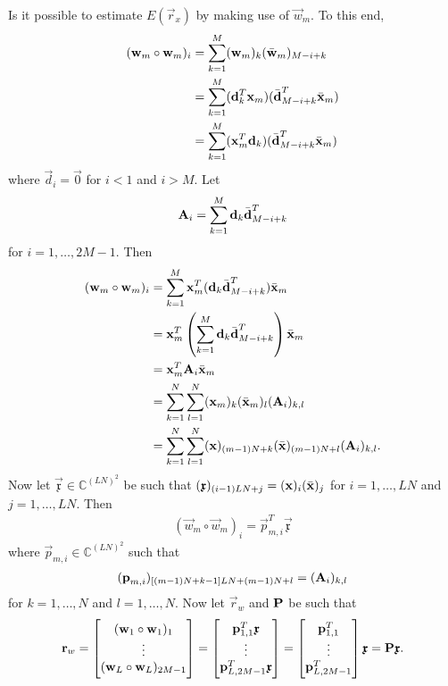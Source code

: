 \documentclass[a4paper, openany, oneside]{memoir}
\begin{document}
Is it possible to estimate $E(\vec{r}_x)$ by making use of $\vec{w}_m$. To this end,
\begin{align*}
    (\boldsymbol{\mathbf{w}}_m \circ \boldsymbol{\mathbf{w}}_m)_i &= \sum_{k=1}^M (\boldsymbol{\mathbf{w}}_m)_k (\bar{\boldsymbol{\mathbf{w}}}_m)_{M-i+k} \\
    &= \sum_{k=1}^M (\boldsymbol{\mathbf{d}}_k^T \boldsymbol{\mathbf{x}}_m)(\bar{\boldsymbol{\mathbf{d}}}_{M-i+k}^T \bar{\boldsymbol{\mathbf{x}}}_m) \\
    &= \sum_{k=1}^M (\boldsymbol{\mathbf{x}}_m^T \boldsymbol{\mathbf{d}}_k)(\bar{\boldsymbol{\mathbf{d}}}_{M-i+k}^T \bar{\boldsymbol{\mathbf{x}}}_m)
\end{align*}
where $\vec{d}_i = \vec{0}$ for $i < 1$ and $i > M$. Let
\begin{align*}
     \boldsymbol{\mathbf{A}}_i = \sum_{k=1}^M  \boldsymbol{\mathbf{d}}_k \bar{\boldsymbol{\mathbf{d}}}_{M-i+k}^T
\end{align*}
for $i = 1,\ldots,2M-1$. Then
\begin{align*}
    (\boldsymbol{\mathbf{w}}_m \circ \boldsymbol{\mathbf{w}}_m)_i &= \sum_{k=1}^M \boldsymbol{\mathbf{x}}_m^T (\boldsymbol{\mathbf{d}}_k \bar{\boldsymbol{\mathbf{d}}}_{M-i+k}^T) \bar{\boldsymbol{\mathbf{x}}}_m \\
    &= \boldsymbol{\mathbf{x}}_m^T\left(\sum_{k=1}^M  \boldsymbol{\mathbf{d}}_k \bar{\boldsymbol{\mathbf{d}}}_{M-i+k}^T\right) \bar{\boldsymbol{\mathbf{x}}}_m \\
    &= \boldsymbol{\mathbf{x}}_m^T \boldsymbol{\mathbf{A}}_i \bar{\boldsymbol{\mathbf{x}}}_m \\
    &= \sum_{k = 1}^N \sum_{l=1}^N (\boldsymbol{\mathbf{x}}_m)_k (\bar{\boldsymbol{\mathbf{x}}}_m)_l (\boldsymbol{\mathbf{A}}_i)_{k,l} \\
    &= \sum_{k = 1}^N \sum_{l=1}^N (\boldsymbol{\mathbf{x}})_{(m-1)N+k} (\bar{\boldsymbol{\mathbf{x}}})_{(m-1)N+l} (\boldsymbol{\mathbf{A}}_i)_{k,l}.
\end{align*}
Now let $\vec{\mathfrak{x}} \in \mathbb{C}^{(LN)^2}$ be such that $(\boldsymbol{\mathbf{\mathfrak{x}}})_{(i-1)LN+j} = (\boldsymbol{\mathbf{x}})_i (\bar{\boldsymbol{\mathbf{x}}})_j$ for $i = 1,\ldots,LN$ and $j = 1,\ldots,LN$. Then
\begin{align*}
    (\vec{w}_m \circ \vec{w}_m)_i = \vec{p}_{m,i}^T \vec{\mathfrak{x}}
\end{align*}
where $\vec{p}_{m,i} \in \mathbb{C}^{(LN)^2}$ such that
\begin{align*}
    (\boldsymbol{\mathbf{p}}_{m,i})_{[(m-1)N+k-1]LN+(m-1)N+l} = (\boldsymbol{\mathbf{A}}_i)_{k,l}
\end{align*}
for $k = 1,\ldots,N$ and $l = 1,\ldots,N$. Now let $\vec{r}_w$ and $\boldsymbol{\mathbf{P}}$ be such that
\begin{align*}
    \boldsymbol{\mathbf{r}}_w = \begin{bmatrix}
        (\boldsymbol{\mathbf{w}}_1 \circ \boldsymbol{\mathbf{w}}_1)_1 \\
        \vdots \\
        (\boldsymbol{\mathbf{w}}_L \circ \boldsymbol{\mathbf{w}}_L)_{2M-1}
    \end{bmatrix} = \begin{bmatrix}
        \boldsymbol{\mathbf{p}}_{1,1}^T \boldsymbol{\mathbf{\mathfrak{x}}} \\
        \vdots \\
        \boldsymbol{\mathbf{p}}_{L,2M-1}^T \boldsymbol{\mathbf{\mathfrak{x}}}
    \end{bmatrix} = \begin{bmatrix}
        \boldsymbol{\mathbf{p}}_{1,1}^T \\
        \vdots \\
        \boldsymbol{\mathbf{p}}_{L,2M-1}^T
    \end{bmatrix} \boldsymbol{\mathbf{\mathfrak{x}}} = \boldsymbol{\mathbf{P}} \boldsymbol{\mathbf{\mathfrak{x}}}.
\end{align*}
\end{document}
